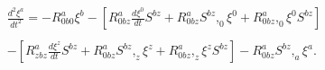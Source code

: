\begin{equation}
\begin{array}{c}
\frac{d^{2}\xi ^{a}}{dt^{2}}=-R_{0b0}^{a}\xi ^{b}-[R_{0bz}^{a}\frac{d\xi ^{0}%
}{dt}S^{bz}+R_{0bz}^{a}S^{bz},_{0}\xi ^{0}+R_{0bz}^{a},_{0}\xi ^{0}S^{bz}]
\\ 
\\ 
-[R_{zbz}^{a}\frac{d\xi ^{z}}{dt}S^{bz}+R_{0bz}^{a}S^{bz},_{z}\xi
^{z}+R_{0bz}^{a},_{z}\xi ^{z}S^{bz}]-R_{0bz}^{a}S^{bz},_{a}\xi ^{a}.
\end{array}
\label{46}
\end{equation}


